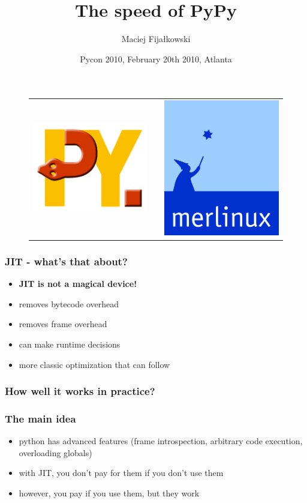 \documentclass[utf8x, 14pt]{beamer}
\title{The speed of PyPy}
\author{Maciej Fijałkowski}
\institute[merlinux GmbH]
{ merlinux GmbH }
\date{Pycon 2010, February 20th 2010, Atlanta}
\begin{document}
\begin{frame}
  \titlepage
  \begin{figure}
    \begin{tabular}{c c c}
    \includegraphics[width=.30\textwidth]{../common/pypy-logo.png}
    &
    \hspace{2cm}
    &
    \includegraphics[width=.25\textwidth]{../common/merlinux-logo.png}
    \end{tabular}
  \end{figure}
\end{frame}

\begin{frame}
  \frametitle{JIT - what's that about?}
  \begin{itemize}
    \item {\bf JIT is not a magical device!}
      \pause
    \item removes bytecode overhead
    \item removes frame overhead
    \item can make runtime decisions
    \item more classic optimization that can follow
  \end{itemize}
\end{frame}

\begin{frame}
  \frametitle{How well it works in practice?}
\end{frame}

\begin{frame}
  \frametitle{The main idea}
  \begin{itemize}
    \item python has advanced features (frame introspection,
      arbitrary code execution, overloading globals)
    \item with JIT, you don't pay for them if you don't use
      them
    \item however, you pay if you use them, but they work
  \end{itemize}
\end{frame}
\end{document}
